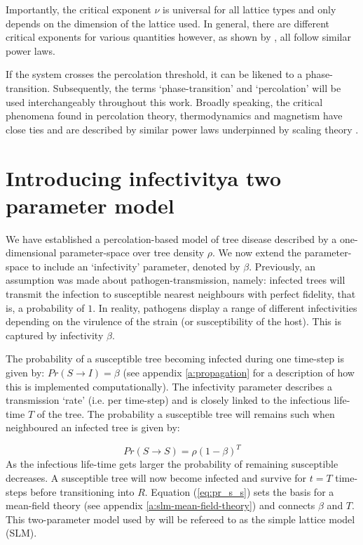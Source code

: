 Importantly, the critical exponent $\nu$ is universal for all lattice types and only depends on the dimension of the lattice used. In general, there are different critical exponents for various quantities however, as shown by \cite{stauffer2018introduction, STAUFFER19791}, all follow similar power laws. 

If the system crosses the percolation threshold, it can be likened to a phase-transition. %
Subsequently, the terms `phase-transition' and `percolation' will be used interchangeably throughout this work. %
Broadly speaking, the critical phenomena found in percolation theory, thermodynamics and magnetism have close ties and are described by similar power laws underpinned by scaling theory \citep{Essam_1980}. %

\section{Introducing infectivity\textemdash a two parameter model}
\label{ch3:two-param-model}

We have established a percolation-based model of tree disease described by a one-dimensional parameter-space over tree density $\rho$. %
We now extend the parameter-space to include an `infectivity' parameter, denoted by $\beta$. %
Previously, an assumption was made about pathogen-transmission, namely: %
infected trees will transmit the infection to susceptible nearest neighbours with perfect fidelity, %
that is, a probability of $1$. In reality, pathogens display a range of different infectivities depending on the virulence of the strain (or susceptibility of the host). %
This is captured by infectivity $\beta$. 

The probability of a susceptible tree becoming infected during one time-step is given by: %
$Pr(S \rightarrow I) = \beta$ (see appendix \ref{a:propagation} for a description of how this is implemented computationally). %
The infectivity parameter describes a transmission `rate' (i.e. per time-step) and is closely linked to the infectious life-time $T$ of the tree. %
The probability a susceptible tree will remains such  when neighboured an infected tree is given by:

\begin{equation}
\label{eq:pr_s_s}
    Pr(S \rightarrow S) = \rho(1 -\beta)^T
\end{equation}
As the infectious life-time gets larger the probability of remaining susceptible decreases. %
A susceptible tree will now become infected and survive for $t=T$ time-steps before transitioning into $R$. %
Equation (\ref{eq:pr_s_s}) sets the basis for a mean-field theory (see appendix \ref{a:slm-mean-field-theory}) and connects $\beta$ and $T$. %
This two-parameter model used by \cite{OROZCOFUENTES201912} will be refereed to as the simple lattice model (SLM). 

